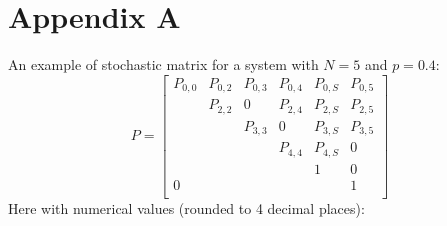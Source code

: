 \section*{Appendix A}
\label{app:a}
An example of stochastic matrix for a system with $N = 5$ and $p = 0.4$:
\begin{equation*}
P = 
\begin{bmatrix}
P_{0,0}	& P_{0,2}	& P_{0,3}  	& P_{0, 4}	& P_{0,S}	& P_{0,5} \\
		& P_{2,2}	& 0  		& P_{2, 4}	& P_{2,S}	& P_{2,5} \\
		& 			& P_{3,3}	& 0			& P_{3,S}	& P_{3,5} \\
		& 			& 			& P_{4,4}	& P_{4,S}	& 0\\
		& 			& 			& 			& 1			& 0\\
0		& 			& 		  	& 			& 			& 1\\
\end{bmatrix}
\label{exampleMatrix}
\end{equation*}
Here with numerical values (rounded to 4 decimal places):


